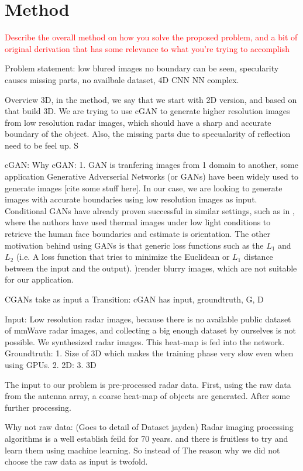 \section{ Method}
\textcolor{red}{
Describe the overall method on how you solve the proposed problem, and a bit of original derivation that has some relevance to what you’re trying to accomplish
}

Problem statement: low blured images no boundary can be seen, specularity causes missing parts, no availbale dataset, 4D CNN NN complex.

Overview 3D, in the method, we say that we start with 2D version, and based on that build 3D. 
We are trying to use cGAN to generate higher resolution images from low resolution radar images, which should have a sharp and accurate boundary of the object. Also, the missing parts due to specualarity of reflection need to be feel up.  S

cGAN:
	Why cGAN:
	1. GAN is tranfering images from 1 domain to another, some application 
	Generative Adverserial Networks (or GANs) have been widely used to generate images [cite some stuff here]. In our case, we are looking to generate images with accurate boundaries using low resolution images as input. Conditional GANs have already proven successful in similar settings, such as in \cite{hams}, where the authors have used thermal images under low light conditions to retrieve the human face boundaries and estimate is orientation. The other motivation behind using GANs is that generic loss functions such as the $L_1$ and $L_2$ (i.e. A loss function that tries to minimize the Euclidean or $L_1$ distance between the input and the output). )render blurry images, which are not suitable for our application. 
	
	CGANs take as input a 
	Transition: cGAN has input, groundtruth, G, D
	
	Input: Low resolution radar images, because there is no available public dataset of mmWave radar images, and collecting a big enough dataset by ourselves is not possible. We synthesized radar images. This heat-map is fed into the network. 
	Groundtruth: 
	1. Size of 3D 	which makes the training phase very slow even when using GPUs. 
	2. 2D:
	3. 3D


The input to our problem is pre-processed radar data. First, using the raw data from the antenna array, a coarse heat-map of objects are generated. After some further processing. 

Why not raw data: (Goes to detail of Dataset jayden)
Radar imaging processing algorithms is a well establish feild for 70 years. and there is fruitless to try and learn them using machine learning.
So instead of  The reason why we did not choose the raw data as input is twofold. 